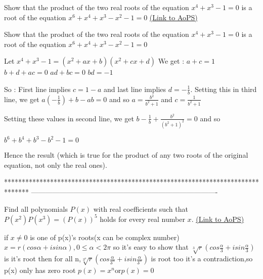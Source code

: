 \begin{problem}
	Show that the product of the two real roots of the equation $ x^4+x^3-1=0$ is a root of the equation $ x^6+x^4+x^3-x^2-1=0$
	\flushright \href{https://artofproblemsolving.com/community/c6h303643}{(Link to AoPS)}
\end{problem}



\begin{solution}
	\begin{tcolorbox}Show that the product of the two real roots of the equation $ x^4 + x^3 - 1 = 0$ is a root of the equation $ x^6 + x^4 + x^3 - x^2 - 1 = 0$\end{tcolorbox}

Let $ x^4+x^3-1=(x^2+ax+b)(x^2+cx+d)$
We get :
$ a+c=1$
$ b+d+ac=0$
$ ad+bc=0$
$ bd=-1$

So :
First line implies $ c=1-a$ and last line implies $ d=-\frac 1b$. Setting this in third line, we get $ a(-\frac 1b)+b-ab=0$ and so $ a=\frac{b^2}{b^2+1}$ and $ c=\frac{1}{b^2+1}$

Setting these values in second line, we get $ b-\frac 1b+\frac{b^2}{(b^2+1)^2}=0$ and so 

$ b^6+b^4+b^3-b^2-1=0$

Hence the result (which is true for the product of any two roots of the original equation, not only the real ones).
\end{solution}
*******************************************************************************
-------------------------------------------------------------------------------

\begin{problem}
	Find all polynomials $ P(x)$ with real coefficients such that $ P(x^2)P(x^3)=(P(x))^5$ holds for every real number $ x$.
	\flushright \href{https://artofproblemsolving.com/community/c6h305577}{(Link to AoPS)}
\end{problem}



\begin{solution}
	if $ x\neq0$ is one of p(x)'s roots(x can be complex number)
$ x = r(cos\alpha + isin\alpha),0\le \alpha < 2\pi$
so it's easy to show that $ \sqrt [3]{r}(cos\frac {\alpha}{3} + isin\frac {\alpha}{3})$ is it's root
then for all n,$ \sqrt [3^{n}]{r}(cos\frac {\alpha}{3^{n}} + isin\frac {\alpha}{3^{n}})$ is root too  
it's a contradiction,so p(x) only has zero root
$ p(x) = x^{n}$or$ p(x) = 0$
\end{solution}



